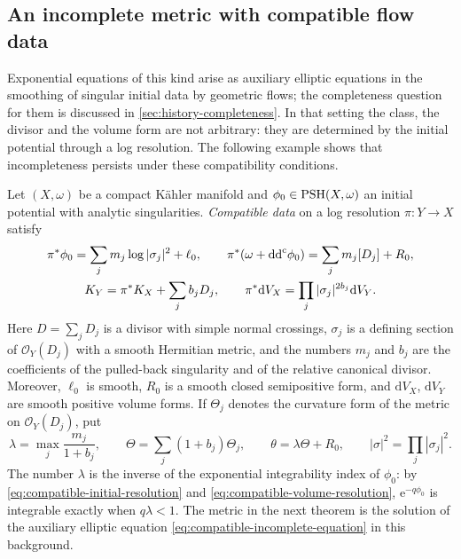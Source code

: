 \subsection{An incomplete metric with compatible flow data}
\label{sec:flow-compatible-incomplete-metric}

Exponential equations of this kind arise as auxiliary elliptic equations in the smoothing of singular initial data by geometric flows; the completeness question for them is discussed in \cref{sec:history-completeness}. In that setting the class, the divisor and the volume form are not arbitrary: they are determined by the initial potential through a log resolution. The following example shows that incompleteness persists under these compatibility conditions.

Let $(X,\omega)$ be a compact K\"ahler manifold and $\phi_0\in\mathrm{PSH}(X,\omega)$ an initial potential with analytic singularities. \emph{Compatible data} on a log resolution $\pi\colon Y\to X$ satisfy
\begin{gather}
 \pi^*\phi_0=\sum_jm_j\log|\sigma_j|^2+\ell_0,\qquad
 \pi^*(\omega+\mathrm{dd}^{\mathrm{c}}\phi_0)=\sum_jm_j[D_j]+R_0,
 \label{eq:compatible-initial-resolution}\\
 K_Y=\pi^*K_X+\sum_jb_jD_j,\qquad
 \pi^*\mathrm{d}V_X=\prod_j|\sigma_j|^{2b_j}\mathrm{d}V_Y.
 \label{eq:compatible-volume-resolution}
\end{gather}
Here $D=\sum_jD_j$ is a divisor with simple normal crossings, $\sigma_j$ is a defining section of $\mathcal O_Y(D_j)$ with a smooth Hermitian metric, and the numbers $m_j$ and $b_j$ are the coefficients of the pulled-back singularity and of the relative canonical divisor. Moreover, $\ell_0$ is smooth, $R_0$ is a smooth closed semipositive form, and $\mathrm{d}V_X$, $\mathrm{d}V_Y$ are smooth positive volume forms. If $\Theta_j$ denotes the curvature form of the metric on $\mathcal O_Y(D_j)$, put
\[
 \lambda=\max_j\frac{m_j}{1+b_j},\qquad
 \Theta=\sum_j(1+b_j)\Theta_j,\qquad
 \theta=\lambda\Theta+R_0,\qquad
 |\sigma|^2=\prod_j|\sigma_j|^2.
\]
The number $\lambda$ is the inverse of the exponential integrability index of $\phi_0$: by \eqref{eq:compatible-initial-resolution} and \eqref{eq:compatible-volume-resolution}, $\mathrm{e}^{-q\phi_0}$ is integrable exactly when $q\lambda<1$. The metric in the next theorem is the solution of the auxiliary elliptic equation \eqref{eq:compatible-incomplete-equation} in this background.

